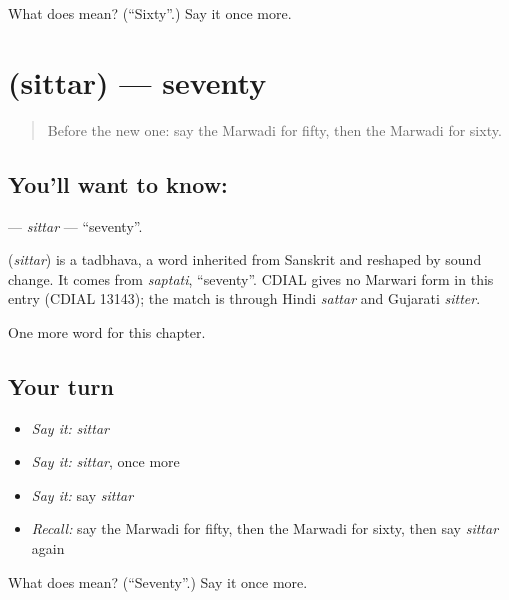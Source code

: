 \begin{tcolorbox}[breakable,colback=teal!4,colframe=teal!35!black,title={Before you move on}]
What does  mean? (\textquotedblleft{}Sixty\textquotedblright{}.) Say it once more.
\end{tcolorbox}
\section[\texorpdfstring{\mw{सित्तर} (sittar)}{सित्तर (sittar)}]{ (sittar) — seventy}

\label{lesson:MW-C86-sittar}



\begin{quote}
Before the new one: say the Marwadi for fifty, then the Marwadi for sixty.
\end{quote}

\subsection*{You'll want to know: }
\textbf{} — \emph{sittar} — \textquotedblleft{}seventy\textquotedblright{}.

\begin{cousinweb}
\textbf{} (\emph{sittar}) is a tadbhava, a word inherited from Sanskrit and reshaped by sound change. It comes from \emph{saptati}, \textquotedblleft{}seventy\textquotedblright{}. CDIAL gives no Marwari form in this entry (CDIAL 13143); the match is through Hindi \emph{sattar} and Gujarati \emph{sitter}.
\end{cousinweb}

\begin{grammarlens}[title={What you've built}]
One more word for this chapter.
\end{grammarlens}

\subsection*{Your turn}
\begin{itemize}
\raggedright
  \item \emph{Say it:} \emph{sittar}
  \item \emph{Say it:} \emph{sittar}, once more
  \item \emph{Say it:} say \emph{sittar}
  \item \emph{Recall:} say the Marwadi for fifty, then the Marwadi for sixty, then say \emph{sittar} again
\end{itemize}

\begin{tcolorbox}[breakable,colback=teal!4,colframe=teal!35!black,title={Before you move on}]
What does  mean? (\textquotedblleft{}Seventy\textquotedblright{}.) Say it once more.
\end{tcolorbox}
